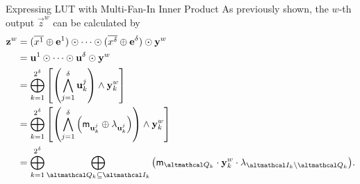 \documentclass[../240906_cryptlab_flute.tex]{subfiles}
\begin{document}
\begin{frame}{Expressing LUT with Multi-Fan-In Inner Product}
    As previously shown, the \(w\)-th output \(\vec{z}^w\) can be calculated by
    \begin{align*}
        \vec{z}^w
        &= (\ol{x^1} \oplus \vec{e}^1) \odot \cdots \odot (\ol{x^\delta} \oplus \vec{e}^\delta) \odot \vec{y}^w \\
        &= \vec{u}^1 \odot \cdots \odot \vec{u}^\delta \odot \vec{y}^w \\
        &= \bigoplus_{k=1}^{2^\delta} \left[ \left(\bigwedge_{j=1}^\delta \vec{u}^j_k\right) \wedge \vec{y}^w_k \right] \\
        &= \bigoplus_{k=1}^{2^\delta} \left[
            \left(\bigwedge_{j=1}^\delta \left( \msf{m}_{\vec{u}^j_k} \oplus \lambda_{\vec{u}^j_k} \right) \right)
            \wedge \vec{y}^w_k \right] \\
        &= \bigoplus_{k=1}^{2^\delta} \bigoplus_{\mcal{Q}_k \subseteq \mcal{I}_k}
            \big( \msf{m}_{\mcal{Q}_k} \cdot \vec{y}^w_k \cdot \lambda_{\mcal{I}_k \setminus \mcal{Q}_k} \big).
    \end{align*}
\end{frame}
\end{document}
